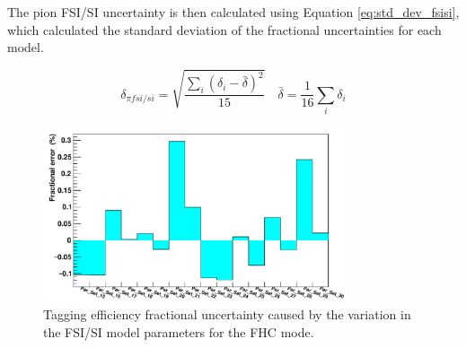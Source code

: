 The pion FSI/SI uncertainty is then calculated using Equation \ref{eq:std_dev_fsisi}, which calculated the standard deviation of the fractional uncertainties for each model.

\begin{equation}
\delta_{\pi f s i / s i}=\sqrt{\frac{\sum_i\left(\delta_i-\bar{\delta}\right)^2}{15}} \quad \bar{\delta}=\frac{1}{16} \sum_i \delta_i
\label{eq:std_dev_fsisi}
\end{equation}


\begin{figure}[!htb]
\centering 
    \includegraphics[width=0.8\textwidth]{Figures/fsisi_uncertainty.png}
\caption{Tagging efficiency fractional uncertainty caused by the variation in the FSI/SI model parameters for the FHC mode.}
\label{fig:fsisiuncertainty}
\end{figure}


